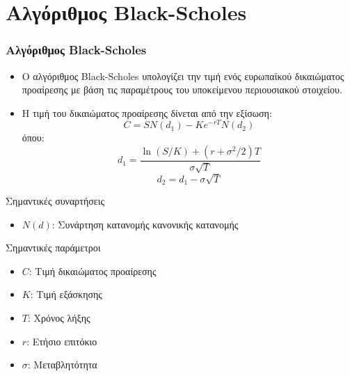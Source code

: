 \section{Αλγόριθμος Black-Scholes}
\begin{frame}
  \frametitle{Αλγόριθμος Black-Scholes}
  \begin{itemize}
    \item Ο αλγόριθμος Black-Scholes υπολογίζει την τιμή ενός ευρωπαϊκού δικαιώματος προαίρεσης με βάση τις παραμέτρους του υποκείμενου περιουσιακού στοιχείου.
    \item Η τιμή του δικαιώματος προαίρεσης δίνεται από την εξίσωση:
      \[
        C = S N(d_1) - K e^{-rT} N(d_2)
      \]
      όπου:
      \[
        d_1 = \frac{\ln(S/K) + (r + \sigma^2/2)T}{\sigma\sqrt{T}}
      \]
      \[
        d_2 = d_1 - \sigma\sqrt{T}
      \]
  \end{itemize}
  \begin{block}{Σημαντικές συναρτήσεις}
    \begin{itemize}
      \item \(N(d)\): Συνάρτηση κατανομής κανονικής κατανομής
    \end{itemize}
  \end{block}
  \begin{block}{Σημαντικές παράμετροι}
    \begin{itemize}
      \item \(C\): Τιμή δικαιώματος προαίρεσης
      \item \(K\): Τιμή εξάσκησης
      \item \(T\): Χρόνος λήξης
      \item \(r\): Ετήσιο επιτόκιο
      \item \(\sigma\): Μεταβλητότητα
    \end{itemize}
  \end{block}
\end{frame}

